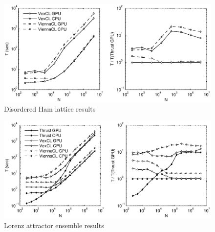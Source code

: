 \documentclass[1p]{elsarticle}
\begin{document}
\begin{figure}[p]
    \begin{center}
        \includegraphics[width=\textwidth]{data/disordered_ham_lattice/perfcmp}
    \end{center}
    \caption{Disordered Ham lattice results}
    \label{fig:lattice:perf}
\end{figure}

\begin{figure}[p]
    \begin{center}
        \includegraphics[width=\textwidth]{data/lorenz_ensemble/perfcmp}
    \end{center}
    \caption{Lorenz attractor ensemble results}
    \label{fig:lorenz:perf}
\end{figure}
\end{document}
